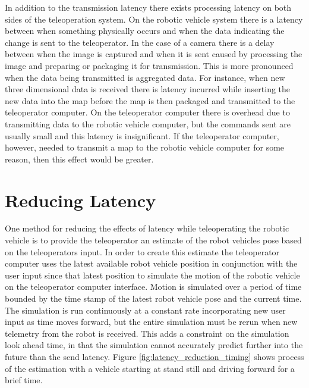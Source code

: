 \documentclass[12pt]{report}
\begin{document}
In addition to the transmission latency there exists processing latency on both sides of the teleoperation system.  On the robotic vehicle system there is a latency between when something physically occurs and when the data indicating the change is sent to the teleoperator.  In the case of a camera there is a delay between when the image is captured and when it is sent caused by processing the image and preparing or packaging it for transmission.  This is more pronounced when the data being transmitted is aggregated data.  For instance, when new three dimensional data is received there is latency incurred while inserting the new data into the map before the map is then packaged and transmitted to the teleoperator computer.  On the teleoperator computer there is overhead due to transmitting data to the robotic vehicle computer, but the commands sent are usually small and this latency is insignificant.  If the teleoperator computer, however, needed to transmit a map to the robotic vehicle computer for some reason, then this effect would be greater.

\section{Reducing Latency}
One method for reducing the effects of latency while teleoperating the robotic vehicle is to provide the teleoperator an estimate of the robot vehicles pose based on the teleoperators input.  In order to create this estimate the teleoperator computer uses the latest available robot vehicle position in conjunction with the user input since that latest position to simulate the motion of the robotic vehicle on the teleoperator computer interface.  Motion is simulated over a period of time bounded by the time stamp of the latest robot vehicle pose and the current time.  The simulation is run continuously at a constant rate incorporating new user input as time moves forward, but the entire simulation must be rerun when new telemetry from the robot is received.  This adds a constraint on the simulation look ahead time, in that the simulation cannot accurately predict further into the future than the send latency.  Figure \ref{fig:latency_reduction_timing} shows process of the estimation with a vehicle starting at stand still and driving forward for a brief time.
\end{document}

